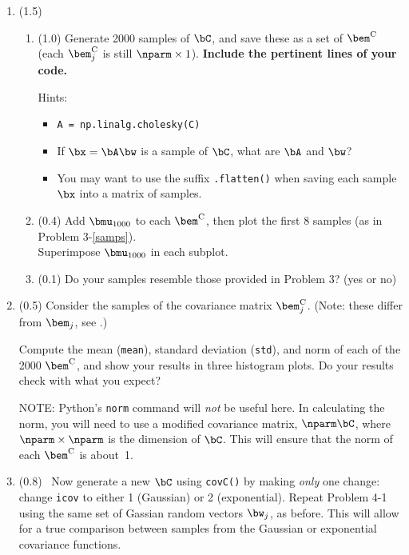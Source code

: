 \documentclass[11pt,titlepage,fleqn]{article}
\begin{document}
\begin{enumerate}
\item (1.5) 

\begin{enumerate}
\item (1.0) Generate 2000 samples of $\bC$, and save these as a set of $\bem^{\rm C}$ (each $\bem_j^{\rm C}$ is still $\nparm \times 1$). {\bf Include the pertinent lines of your code.}

Hints:
%
\begin{itemize}
\item \verb+A = np.linalg.cholesky(C)+
\item If $\bx = \bA\bw$ is a sample of $\bC$, what are $\bA$ and $\bw$?
\item You may want to use the suffix \verb+.flatten()+ when saving each sample $\bx$ into a matrix of samples.
\end{itemize}

\item (0.4) Add $\bmu_{1000}$ to each $\bem^{\rm C}$, then plot the first 8 samples (as in Problem 3-\ref{samps}). \\
Superimpose $\bmu_{1000}$ in each subplot.

\item (0.1) Do your samples resemble those provided in Problem 3? (yes or no)
\end{enumerate}


\item (0.5) Consider the samples of the covariance matrix $\bem_j^{\rm C}$. (Note: these differ from $\bem_j$, see .)

Compute the mean (\verb+mean+), standard deviation (\verb+std+), and norm of each of the 2000 $\bem^{\rm C}$, and show your results in three histogram plots. Do your results check with what you expect?

NOTE: Python's \verb+norm+ command will {\em not} be useful here. In calculating the norm, you will need to use a modified covariance matrix, $\nparm\bC$, where $\nparm\times\nparm$ is the dimension of $\bC$. This will ensure that the norm of each $\bem^{\rm C}$ is about~1.


\item (0.8) \ptag\ Now generate a new $\bC$ using \verb+covC()+ by making {\em only} one change: change \verb+icov+ to either 1 (Gaussian) or 2 (exponential). Repeat Problem 4-1 using the same set of Gassian random vectors $\bw_j$, as before. This will allow for a true comparison between samples from the Gaussian or exponential covariance functions.


\end{enumerate}
\end{document}
